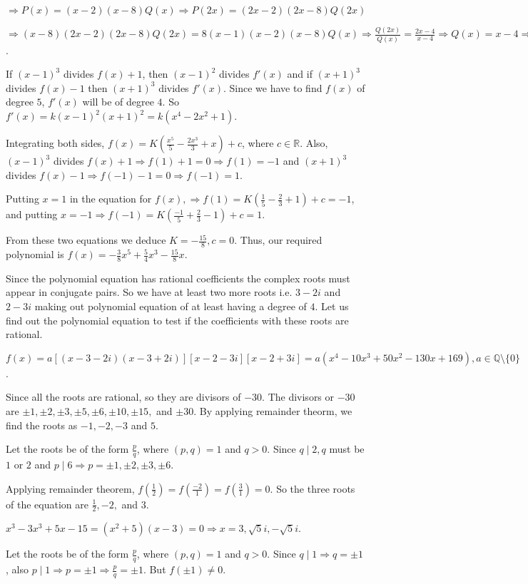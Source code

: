   $\Rightarrow P(x) = (x - 2)(x - 8)Q(x) \Rightarrow P(2x) = (2x - 2)(2x - 8)Q(2x)$

  $\Rightarrow (x - 8)(2x - 2)(2x - 8)Q(2x) = 8(x - 1)(x - 2)(x - 8)Q(x)\Rightarrow \frac{Q(2x)}{Q(x)} =
  \frac{2x - 4}{x - 4} \Rightarrow Q(x) = x - 4 \Rightarrow P(x) = (x - 2)(x - 4)(x - 8)$.
\item If $(x - 1)^3$ divides $f(x) + 1$, then $(x - 1)^2$ divides $f'(x)$ and if $(x + 1)^3$ divides $f(x) -
  1$ then $(x + 1)^3$ divides $f'(x)$. Since we have to find $f(x)$ of degree $5$, $f'(x)$ will be of degree
  $4$. So $f'(x) = k(x - 1)^2(x + 1)^2 = k(x^4 - 2x^2 + 1)$.

  Integrating both sides, $f(x) = K\left(\frac{x^5}{5} - \frac{2x^3}{3} + x\right) + c$, where
  $c\in\mathbb{R}$. Also, $(x - 1)^3$ divides $f(x) + 1\Rightarrow f(1) + 1 = 0 \Rightarrow f(1) = -1$ and
  $(x + 1)^3$ divides $f(x) - 1\Rightarrow f(-1) - 1= 0 \Rightarrow f(-1) = 1$.

  Putting $x = 1$ in the equation for $f(x), \Rightarrow f(1) = K\left(\frac{1}{5} - \frac{2}{3} + 1\right)
  + c= -1$, and putting $x = -1 \Rightarrow f(-1) = K\left(\frac{-1}{5} + \frac{2}{3} - 1\right) +c = 1$.

  From these two equations we deduce $K = -\frac{15}{8}, c = 0$. Thus, our required polynomial is $f(x) =
  -\frac{3}{8}x^5 + \frac{5}{4}x^3 - \frac{15}{8}x$.
\item Since the polynomial equation has rational coefficients the complex roots must appear in conjugate
  pairs. So we have at least two more roots i.e. $3 - 2i$ and $2 - 3i$ making out polynomial equation of at
  least having a degree of $4$. Let us find out the polynomial equation to test if the coefficients with
  these roots are rational.

  $f(x) = a[(x - 3 - 2i)(x - 3 + 2i)][x - 2 - 3i][x - 2 + 3i] = a(x^4 - 10x^3 + 50x^2 - 130x + 169),
  a\in\mathbb{Q}\setminus\{0\}$.
\item Since all the roots are rational, so they are divisors of $-30$. The divisors or $-30$ are $\pm1,
  \pm2, \pm3, \pm5, \pm6, \pm 10, \pm 15,$ and $\pm30$. By applying remainder theorm, we find the roots as
  $-1, -2, -3$ and $5$.
\item Let the roots be of the form $\frac{p}{q}$, where $(p, q) = 1$ and $q > 0$. Since $q\mid 2, q$ must be
  $1$ or $2$ and $p\mid 6\Rightarrow p = \pm 1, \pm 2, \pm 3, \pm 6$.

  Applying remainder theorem, $f\left(\frac{1}{2}\right) = f\left(\frac{-2}{1}\right) =
  f\left(\frac{3}{1}\right) = 0$. So the three roots of the equation are $\frac{1}{2}, -2,$ and $3$.
\item $x^3 - 3x^3 + 5x - 15 = (x^2 + 5)(x - 3) = 0 \Rightarrow x = 3, \sqrt{5}i, -\sqrt{5}i$.
\item Let the roots be of the form $\frac{p}{q}$, where $(p, q) = 1$ and $q > 0$. Since $q\mid 1\Rightarrow
  q = \pm1$, also $p\mid1 \Rightarrow p = \pm 1 \Rightarrow \frac{p}{q} = \pm1$. But $f(\pm1) \neq 0$.

